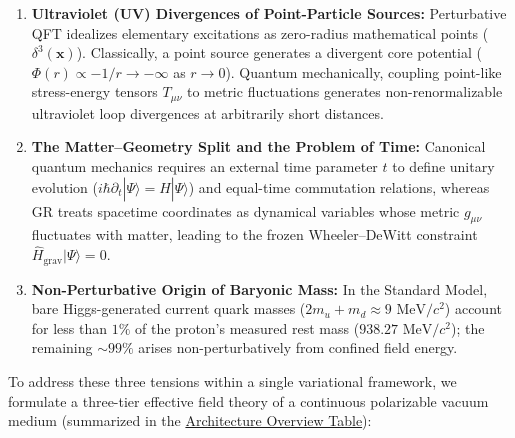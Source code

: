 \documentclass[10pt,aps,prd,twocolumn,superscriptaddress,nofootinbib,floatfix,longbibliography,showkeys]{revtex4-2}
\begin{document}
\begin{enumerate}
  \item \textbf{Ultraviolet (UV) Divergences of Point-Particle Sources:} Perturbative QFT idealizes elementary excitations as zero-radius mathematical points ($\delta^3(\mathbf{x})$). Classically, a point source generates a divergent core potential ($\Phi(r) \propto -1/r \to -\infty$ as $r \to 0$). Quantum mechanically, coupling point-like stress-energy tensors $T_{\mu\nu}$ to metric fluctuations generates non-renormalizable ultraviolet loop divergences at arbitrarily short distances.
  \item \textbf{The Matter--Geometry Split and the Problem of Time:} Canonical quantum mechanics requires an external time parameter $t$ to define unitary evolution ($i\hbar \partial_t |\Psi\rangle = \hat{H}|\Psi\rangle$) and equal-time commutation relations, whereas GR treats spacetime coordinates as dynamical variables whose metric $g_{\mu\nu}$ fluctuates with matter, leading to the frozen Wheeler--DeWitt constraint $\hat{H}_{\text{grav}}|\Psi\rangle = 0$.
  \item \textbf{Non-Perturbative Origin of Baryonic Mass:} In the Standard Model, bare Higgs-generated current quark masses ($2m_u + m_d \approx 9\text{ MeV}/c^2$) account for less than $1\%$ of the proton's measured rest mass ($938.27\text{ MeV}/c^2$); the remaining $\sim 99\%$ arises non-perturbatively from confined field energy.

\end{enumerate}
To address these three tensions within a single variational framework, we formulate a three-tier effective field theory of a continuous polarizable vacuum medium (summarized in the \hyperref[tab:arch]{Architecture Overview Table}):
\end{document}
